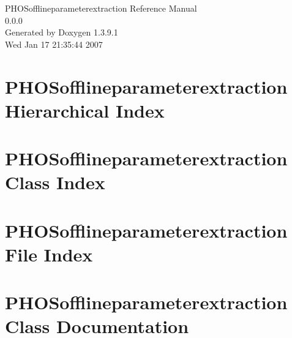 \documentclass[a4paper]{book}
\begin{document}
\begin{titlepage}
\vspace*{7cm}
\begin{center}
{\Large PHOSofflineparameterextraction Reference Manual\\[1ex]\large 0.0.0 }\\
\vspace*{1cm}
{\large Generated by Doxygen 1.3.9.1}\\
\vspace*{0.5cm}
{\small Wed Jan 17 21:35:44 2007}\\
\end{center}
\end{titlepage}
\clearemptydoublepage
{}
\tableofcontents
\clearemptydoublepage
{}
\chapter{PHOSofflineparameterextraction Hierarchical Index}

\chapter{PHOSofflineparameterextraction Class Index}

\chapter{PHOSofflineparameterextraction File Index}

\chapter{PHOSofflineparameterextraction Class Documentation}











\end{document}
